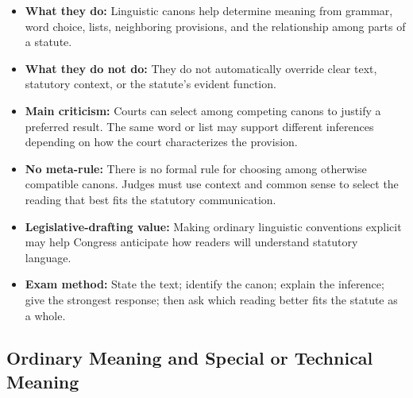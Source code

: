 \documentclass[11pt]{tex/lawoutline}
\begin{document}
\begin{itemize}
    \item \textbf{What they do:} Linguistic canons help determine meaning from grammar, word choice, lists, neighboring provisions, and the relationship among parts of a statute.
    \item \textbf{What they do not do:} They do not automatically override clear text, statutory context, or the statute's evident function.
    \item \textbf{Main criticism:} Courts can select among competing canons to justify a preferred result. The same word or list may support different inferences depending on how the court characterizes the provision.
    \item \textbf{No meta-rule:} There is no formal rule for choosing among otherwise compatible canons. Judges must use context and common sense to select the reading that best fits the statutory communication.
    \item \textbf{Legislative-drafting value:} Making ordinary linguistic conventions explicit may help Congress anticipate how readers will understand statutory language.
    \item \textbf{Exam method:} State the text; identify the canon; explain the inference; give the strongest response; then ask which reading better fits the statute as a whole.
\end{itemize}

\subsection{Ordinary Meaning and Special or Technical Meaning}
\end{document}
